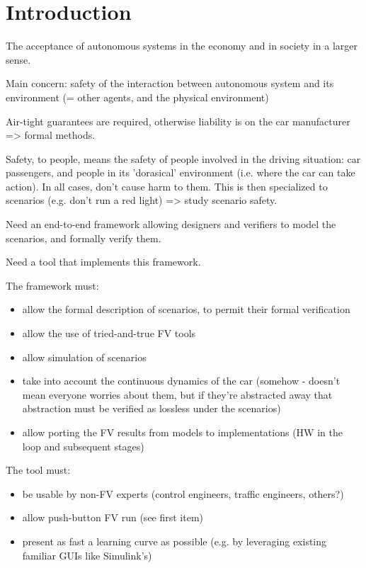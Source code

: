 \section{Introduction}
\label{introduction}

The acceptance of autonomous systems in the economy and in society in a larger sense.

Main concern: safety of the interaction between autonomous system and its environment (= other agents, and the physical environment)

Air-tight guarantees are required, otherwise liability is on the car manufacturer => formal methods.

Safety, to people, means the safety of people involved in the driving situation: car passengers, and people in its 'dorasical' environment (i.e. where the car can take action). 
In all cases, don't cause harm to them. 
This is then specialized to scenarios (e.g. don't run a red light) => study scenario safety.

Need an end-to-end framework allowing designers and verifiers to model the scenarios, and formally verify them.


Need a tool that implements this framework.

The framework must: 
\begin{itemize}
\item allow the formal description of scenarios, to permit their formal verification
\item allow the use of tried-and-true FV tools
\item allow simulation of scenarios
\item take into account the continuous dynamics of the car (somehow - doesn't mean everyone worries about them, but if they're abstracted away that abstraction must be verified as lossless under the scenarios)
\item allow porting the FV results from models to implementations (HW in the loop and subsequent stages)
\end{itemize}

The tool must:
\begin{itemize}
	\item be usable by non-FV experts (control engineers, traffic engineers, others?)
	\item allow push-button FV run (see first item)
	\item present as fast a learning curve as possible (e.g. by leveraging existing familiar GUIs like Simulink's)
\end{itemize}

